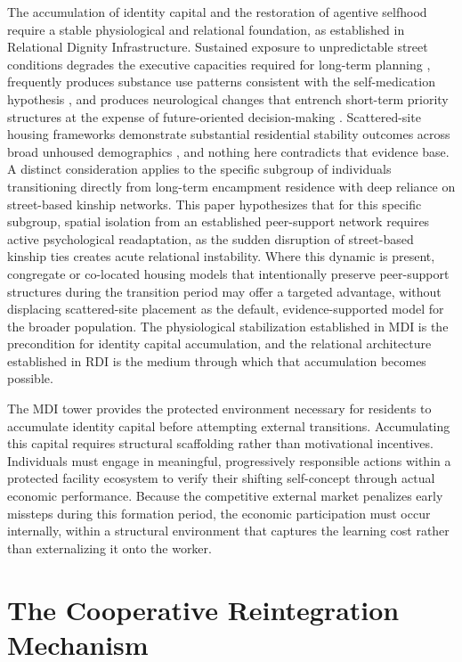 \documentclass[12pt, letterpaper]{article}
\begin{document}
The accumulation of identity capital and the restoration of agentive selfhood require a stable physiological and relational foundation, as established in Relational Dignity Infrastructure. Sustained exposure to unpredictable street conditions degrades the executive capacities required for long-term planning \cite{arnsten2009stress}, frequently produces substance use patterns consistent with the self-medication hypothesis \cite{khantzian1985self}, and produces neurological changes that entrench short-term priority structures at the expense of future-oriented decision-making \cite{volkow2016neurobiologic}. Scattered-site housing frameworks demonstrate substantial residential stability outcomes across broad unhoused demographics \cite{tsemberis2004housing}, and nothing here contradicts that evidence base. A distinct consideration applies to the specific subgroup of individuals transitioning directly from long-term encampment residence with deep reliance on street-based kinship networks. This paper hypothesizes that for this specific subgroup, spatial isolation from an established peer-support network requires active psychological readaptation, as the sudden disruption of street-based kinship ties creates acute relational instability. Where this dynamic is present, congregate or co-located housing models that intentionally preserve peer-support structures during the transition period may offer a targeted advantage, without displacing scattered-site placement as the default, evidence-supported model for the broader population. The physiological stabilization established in MDI is the precondition for identity capital accumulation, and the relational architecture established in RDI is the medium through which that accumulation becomes possible.

The MDI tower provides the protected environment necessary for residents to accumulate identity capital before attempting external transitions. Accumulating this capital requires structural scaffolding rather than motivational incentives. Individuals must engage in meaningful, progressively responsible actions within a protected facility ecosystem to verify their shifting self-concept through actual economic performance. Because the competitive external market penalizes early missteps during this formation period, the economic participation must occur internally, within a structural environment that captures the learning cost rather than externalizing it onto the worker.

\section{The Cooperative Reintegration Mechanism}
\end{document}
